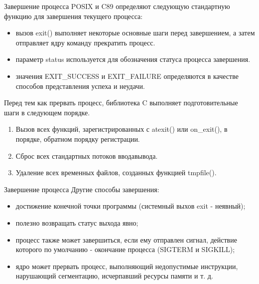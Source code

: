 \documentclass[xcolor=table]{beamer}
\begin{document}
\begin{frame}{Завершение процесса}
	POSIX и C89 определяют следующую стандартную функцию для завершения текущего процесса:
	\begin{itemize}
		\item вызов exit() выполняет некоторые основные шаги перед завершением, а затем отправляет ядру команду прекратить процесс.
		\item параметр status используется для обозначения статуса процесса завершения.
		\item значения EXIT\_SUCCESS и EXIT\_FAILURE определяются в качестве способов представления успеха и неудачи. 
	\end{itemize}
	Перед тем как прервать процесс, библиотека C выполняет подготовительные шаги в следующем порядке.
	\begin{enumerate}
		\item Вызов всех функций, зарегистрированных с atexit() или on\_exit(), в порядке, обратном порядку регистрации.
		\item Сброс всех стандартных потоков ввода­вывода.
		\item Удаление всех временных файлов, созданных функцией tmpfile(). 
	\end{enumerate}
\end{frame}

\begin{frame}{Завершение процесса}
	Другие способы завершения:
	\begin{itemize}
		\item достижение конечной точки программы (системный выхов exit - неявный);
		\item полезно возвращать статус выхода явно;
		\item процесс также может завершиться, если ему отправлен сигнал, действие которого по умолчанию - окончание процесса (SIGTERM и 		SIGKILL);
		\item ядро может прервать процесс, выполняющий недопустимые инструкции, нарушающий сегментацию, исчерпавший ресурсы памяти и т. д.
\end{itemize}
\end{frame}
\end{document}
